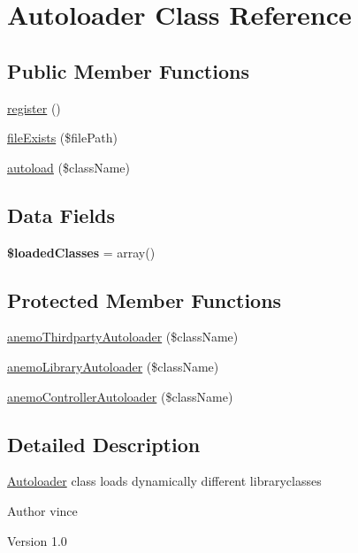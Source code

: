 \hypertarget{class_anemo_1_1_autoloader}{
\section{Autoloader Class Reference}
\label{class_anemo_1_1_autoloader}
}
\subsection*{Public Member Functions}
\begin{DoxyCompactItemize}
\item 
\hyperlink{class_anemo_1_1_autoloader_acc294a6cc8e69743746820e3d15e3f78}{register} ()
\item 
\hyperlink{class_anemo_1_1_autoloader_a21dec87fa516b4bea4733b8a2e5dbb5b}{fileExists} (\$filePath)
\item 
\hyperlink{class_anemo_1_1_autoloader_a554c5ec3a650c5bf28f6ffa88bc4500a}{autoload} (\$className)
\end{DoxyCompactItemize}
\subsection*{Data Fields}
\begin{DoxyCompactItemize}
\item 
\hypertarget{class_anemo_1_1_autoloader_a90c9f0d6c37f97b2ee3ea231b9ca597c}{
{\bfseries \$loadedClasses} = array()}
\label{class_anemo_1_1_autoloader_a90c9f0d6c37f97b2ee3ea231b9ca597c}

\end{DoxyCompactItemize}
\subsection*{Protected Member Functions}
\begin{DoxyCompactItemize}
\item 
\hyperlink{class_anemo_1_1_autoloader_a8dd1854ac4edda242d23829f25023f7b}{anemoThirdpartyAutoloader} (\$className)
\item 
\hyperlink{class_anemo_1_1_autoloader_a66b1a115d3c8182cdf5682ddbf3d8e38}{anemoLibraryAutoloader} (\$className)
\item 
\hyperlink{class_anemo_1_1_autoloader_aa5fb95667e129e5e12003e1ec525b8d3}{anemoControllerAutoloader} (\$className)
\end{DoxyCompactItemize}


\subsection{Detailed Description}
\hyperlink{class_anemo_1_1_autoloader}{Autoloader} class loads dynamically different libraryclasses \begin{DoxyAuthor}{Author}
vince 
\end{DoxyAuthor}
\begin{DoxyVersion}{Version}
1.0 
\end{DoxyVersion}


